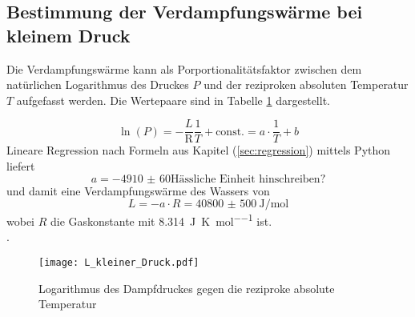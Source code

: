\subsection{Bestimmung der Verdampfungswärme bei kleinem Druck}
\label{sec:bestimmungverdampfungswarme}
Die Verdampfungswärme kann als Porportionalitätsfaktor zwischen dem natürlichen Logarithmus des Druckes $P$ und der reziproken absoluten Temperatur $T$ aufgefasst werden. Die Wertepaare sind in Tabelle \ref{tab:druck-temperatur} dargestellt.
\begin{figure}
	\centering

\label{tab:druck-temperatur}
\end{figure}

\begin{equation}
\ln(P) = - \frac{L}{\text{R}} \frac{1}{T} + \text{const.} = a \cdot \frac{1}{T} +b
\end{equation}
Lineare Regression nach Formeln aus Kapitel (\ref{sec:regression}) mittels Python liefert
\begin{equation}
a= \num{-4910(60)}  \text{Hässliche Einheit hinschreiben?}
\end{equation}
und damit eine Verdampfungswärme des Wassers von
\begin{equation}
L = - a \cdot R = \SI{40800(500)}{\joule\per\mol} 
\end{equation}
wobei $R$ die Gaskonstante mit \SI{8.314}{\joule\per\kelvin\per\mol} ist. \\
.


\begin{figure}[h!]
	\centering
	\texttt{[image: L\_kleiner\_Druck.pdf]}
	\caption{Logarithmus des Dampfdruckes gegen die reziproke absolute Temperatur}
	\label{fig:L_kleiner_Druck}
\end{figure}

